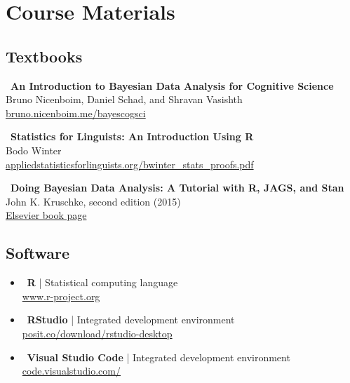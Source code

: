 \documentclass[11pt,letterpaper]{article}
\begin{document}
\section{Course Materials}

\subsection{Textbooks}

\begin{tcolorbox}[colback=white,colframe=accentblue,boxrule=0.5pt,arc=2mm]
\faBook\ \textbf{An Introduction to Bayesian Data Analysis for Cognitive Science}\\
\phantom{\faBook\ }Bruno Nicenboim, Daniel Schad, and Shravan Vasishth\\
\phantom{\faBook\ }\href{https://bruno.nicenboim.me/bayescogsci/}{bruno.nicenboim.me/bayescogsci}
\end{tcolorbox}

\begin{tcolorbox}[colback=white,colframe=accentblue,boxrule=0.5pt,arc=2mm]
\faBook\ \textbf{Statistics for Linguists: An Introduction Using R}\\
\phantom{\faBook\ }Bodo Winter\\
\phantom{\faBook\ }\href{https://appliedstatisticsforlinguists.org/bwinter_stats_proofs.pdf}{appliedstatisticsforlinguists.org/bwinter\_stats\_proofs.pdf}
\end{tcolorbox}

\begin{tcolorbox}[colback=white,colframe=accentblue,boxrule=0.5pt,arc=2mm]
\faBook\ \textbf{Doing Bayesian Data Analysis: A Tutorial with R, JAGS, and Stan}\\
\phantom{\faBook\ }John K. Kruschke, second edition (2015)\\
\phantom{\faBook\ }\href{https://www.educate.elsevier.com/book/details/9780124058880}{Elsevier book page}
\end{tcolorbox}

\subsection{Software}

\begin{itemize}[leftmargin=*]
    \item \faCode\ \textbf{R} | Statistical computing language\\
    \phantom{\faLaptop\ }\href{https://www.r-project.org/}{www.r-project.org}
    
    \item \faLaptop\ \textbf{RStudio} | Integrated development environment\\
    \phantom{\faCode\ }\href{https://posit.co/download/rstudio-desktop/}{posit.co/download/rstudio-desktop}

    \item \faTerminal\ \textbf{Visual Studio Code} | Integrated development environment\\
    \phantom{\faTerminal\ }\href{https://code.visualstudio.com/}{code.visualstudio.com/}
\end{itemize}
\end{document}
